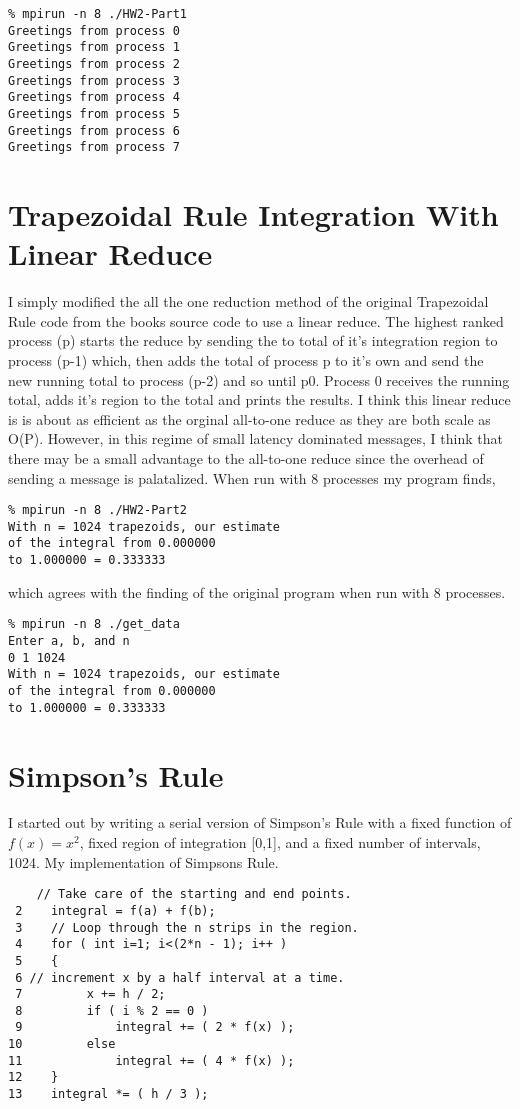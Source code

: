 \documentclass{IEEEtran}
\begin{document}
\begin{verbatim}
% mpirun -n 8 ./HW2-Part1  
Greetings from process 0 
Greetings from process 1 
Greetings from process 2 
Greetings from process 3 
Greetings from process 4 
Greetings from process 5 
Greetings from process 6 
Greetings from process 7
\end{verbatim}

\section{Trapezoidal Rule Integration With Linear Reduce}
I simply modified the all the one reduction method of the original Trapezoidal Rule code from the books source code to use a linear reduce. The highest ranked process (p) starts the reduce by sending the to total of it’s integration region to process (p-1) which, then adds the total of process p to it’s own and send the new running total to process (p-2) and so until p0. Process 0 receives the running total, adds it’s region to the total and prints the results. I think this linear reduce is is about as efficient as the orginal all-to-one reduce as they are both scale as O(P). However, in this regime of small latency dominated messages, I think that there may be a small advantage to the all-to-one reduce since the overhead of sending a message is palatalized. When run with 8 processes my program finds,

\begin{verbatim}
% mpirun -n 8 ./HW2-Part2 
With n = 1024 trapezoids, our estimate 
of the integral from 0.000000 
to 1.000000 = 0.333333
\end{verbatim}

which agrees with the finding of the original program when run with 8 processes.

\begin{verbatim}
% mpirun -n 8 ./get_data  
Enter a, b, and n 
0 1 1024 
With n = 1024 trapezoids, our estimate 
of the integral from 0.000000 
to 1.000000 = 0.333333
\end{verbatim}

\section{Simpson's Rule}
I started out by writing a serial version of Simpson’s Rule with a fixed function of $f(x) = x^{2}$, fixed region of integration [0,1], and a fixed number of intervals, 1024.  My implementation of Simpsons Rule.

\begin{verbatim}
    // Take care of the starting and end points. 
 2    integral = f(a) + f(b); 
 3    // Loop through the n strips in the region. 
 4    for ( int i=1; i<(2*n - 1); i++ ) 
 5    { 
 6 // increment x by a half interval at a time.
 7         x += h / 2; 
 8         if ( i % 2 == 0 ) 
 9             integral += ( 2 * f(x) ); 
10         else  
11             integral += ( 4 * f(x) ); 
12    } 
13    integral *= ( h / 3 );
\end{verbatim}
\end{document}
